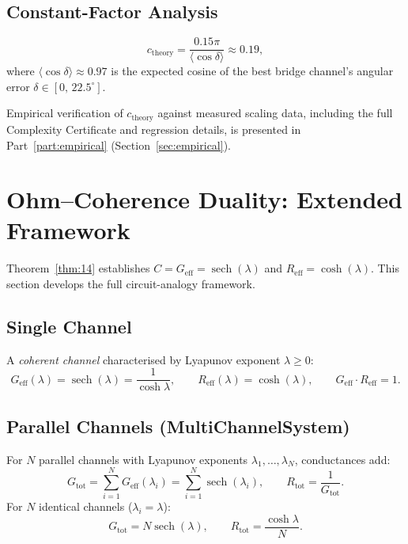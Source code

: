 \documentclass[12pt,a4paper]{article}
\theoremstyle{plain}
\theoremstyle{definition}
\theoremstyle{remark}
\newcommand{\Geff}{G_{\mathrm{eff}}}
\newcommand{\Reff}{R_{\mathrm{eff}}}
\begin{document}
\subsection{Constant-Factor Analysis}

\begin{equation}
  c_{\mathrm{theory}}
  = \frac{0.15\pi}{\langle\cos\delta\rangle}
  \approx 0.19,
  \label{eq:c-theory}
\end{equation}
where $\langle\cos\delta\rangle \approx 0.97$ is the expected cosine of the
best bridge channel's angular error $\delta\in[0,\,22.5^\circ]$.

Empirical verification of $c_{\mathrm{theory}}$ against measured scaling data,
including the full Complexity Certificate and regression details, is presented
in Part~\ref{part:empirical} (Section~\ref{sec:empirical}).

\section{Ohm--Coherence Duality: Extended Framework}
\label{sec:ohm}

Theorem~\ref{thm:14} establishes $C = \Geff = \operatorname{sech}(\lambda)$
and $\Reff = \cosh(\lambda)$.  This section develops the full circuit-analogy
framework.

\subsection{Single Channel}

A \emph{coherent channel} characterised by Lyapunov exponent $\lambda\ge0$:
\begin{equation}
  \Geff(\lambda) = \operatorname{sech}(\lambda) = \frac{1}{\cosh\lambda},\qquad
  \Reff(\lambda) = \cosh(\lambda),\qquad
  \Geff \cdot \Reff = 1.
  \label{eq:single-channel}
\end{equation}

\subsection{Parallel Channels (MultiChannelSystem)}

For $N$ parallel channels with Lyapunov exponents $\lambda_1,\ldots,\lambda_N$,
conductances add:
\begin{equation}
  G_{\mathrm{tot}} = \sum_{i=1}^{N} \Geff(\lambda_i)
                   = \sum_{i=1}^{N} \operatorname{sech}(\lambda_i),\qquad
  R_{\mathrm{tot}} = \frac{1}{G_{\mathrm{tot}}}.
  \label{eq:parallel}
\end{equation}
For $N$ identical channels ($\lambda_i = \lambda$):
\begin{equation}
  G_{\mathrm{tot}} = N\operatorname{sech}(\lambda),\qquad
  R_{\mathrm{tot}} = \frac{\cosh\lambda}{N}.
  \label{eq:parallel-hom}
\end{equation}
\end{document}
